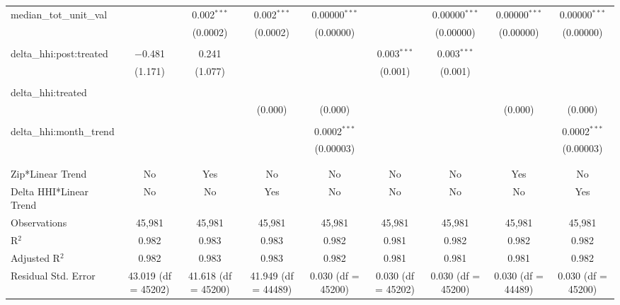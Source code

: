 \begin{table}[H]
{\begin{tabular}{@{\extracolsep{5pt}}lcccccccc}
  median\_tot\_unit\_val &  & 0.002$^{***}$ & 0.002$^{***}$ & 0.00000$^{***}$ &  & 0.00000$^{***}$ & 0.00000$^{***}$ & 0.00000$^{***}$ \\  

   &  & (0.0002) & (0.0002) & (0.00000) &  & (0.00000) & (0.00000) & (0.00000) \\  

   & & & & & & & & \\  

  delta\_hhi:post:treated & $-$0.481 & 0.241 &  &  & 0.003$^{***}$ & 0.003$^{***}$ &  &  \\  

   & (1.171) & (1.077) &  &  & (0.001) & (0.001) &  &  \\  

   & & & & & & & & \\  

  delta\_hhi:treated &  &  &  &  &  &  &  &  \\  

   &  &  & (0.000) & (0.000) &  &  & (0.000) & (0.000) \\  

   & & & & & & & & \\  

  delta\_hhi:month\_trend &  &  &  & 0.0002$^{***}$ &  &  &  & 0.0002$^{***}$ \\  

   &  &  &  & (0.00003) &  &  &  & (0.00003) \\  

   & & & & & & & & \\  

 \hline \\[-1.8ex]  

 Zip*Linear Trend & No & Yes & No & No & No & No & Yes & No \\  

 Delta HHI*Linear Trend & No & No & Yes & No & No & No & No & Yes \\  

 Observations & 45,981 & 45,981 & 45,981 & 45,981 & 45,981 & 45,981 & 45,981 & 45,981 \\  

 R$^{2}$ & 0.982 & 0.983 & 0.983 & 0.982 & 0.981 & 0.982 & 0.982 & 0.982 \\  

 Adjusted R$^{2}$ & 0.982 & 0.983 & 0.983 & 0.982 & 0.981 & 0.981 & 0.981 & 0.982 \\  

 Residual Std. Error & 43.019 (df = 45202) & 41.618 (df = 45200) & 41.949 (df = 44489) & 0.030 (df = 45200) & 0.030 (df = 45202) & 0.030 (df = 45200) & 0.030 (df = 44489) & 0.030 (df = 45200) \\  


\end{tabular}}
\end{table}
